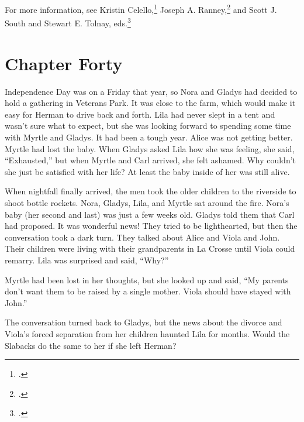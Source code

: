\documentclass[
  american,
  letterpaper,
]{book}
\begin{document}
For more information, see Kristin Celello,\footnote{.} Joseph A. Ranney,\footnote{.} and
Scott J. South and Stewart E. Tolnay, eds.\footnote{.}


\chapter{Chapter Forty}\label{chapter-forty}

Independence Day was on a Friday that year, so Nora and Gladys had
decided to hold a gathering in Veterans Park. It was close to the farm,
which would make it easy for Herman to drive back and forth. Lila had
never slept in a tent and wasn't sure what to expect, but she was
looking forward to spending some time with Myrtle and Gladys. It had
been a tough year. Alice was not getting better. Myrtle had lost the
baby. When Gladys asked Lila how she was feeling, she said,
``Exhausted,'' but when Myrtle and Carl arrived, she felt ashamed. Why
couldn't she just be satisfied with her life? At least the baby inside
of her was still alive.

When nightfall finally arrived, the men took the older children to the
riverside to shoot bottle rockets. Nora, Gladys, Lila, and Myrtle sat
around the fire. Nora's baby (her second and last) was just a few weeks
old. Gladys told them that Carl had proposed. It was wonderful news!
They tried to be lighthearted, but then the conversation took a dark
turn. They talked about Alice and Viola and John. Their children were
living with their grandparents in La Crosse until Viola could remarry.
Lila was surprised and said, ``Why?''

Myrtle had been lost in her thoughts, but she looked up and said, ``My
parents don't want them to be raised by a single mother. Viola should
have stayed with John.''

The conversation turned back to Gladys, but the news about the divorce
and Viola's forced separation from her children haunted Lila for months.
Would the Slabacks do the same to her if she left Herman?
\end{document}

